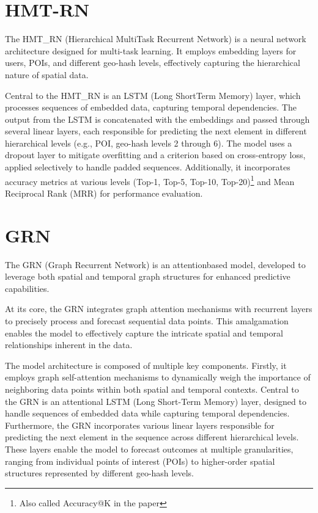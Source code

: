 \documentclass[twocolumn,twoside]{article}
\begin{document}
\section{HMT-RN}
The HMT\_RN (Hierarchical Multi\-Task Recurrent Network) is a
neural network architecture designed for multi-task learning. It employs
embedding layers for users, POIs, and different geo-hash levels,
effectively capturing the hierarchical nature of spatial data.

Central to the HMT\_RN is an LSTM (Long Short\-Term Memory) layer,
which processes sequences of embedded data, capturing temporal dependencies.
The output from the LSTM is concatenated with the embeddings
and passed through several linear layers, each responsible
for predicting the next element in different hierarchical
levels (e.g., POI, geo-hash levels 2 through 6). The model
uses a dropout layer to mitigate overfitting and a
criterion based on cross-entropy loss, applied selectively
to handle padded sequences. Additionally,
it incorporates accuracy metrics at various
levels (Top-1, Top-5, Top-10, Top-20)\footnote{Also called Accuracy@K in the paper\cite{main_paper}} and
Mean Reciprocal Rank (MRR) for performance
evaluation.
\section{GRN}
The GRN (Graph Recurrent Network) is an attention\-based model, developed to
leverage both spatial and temporal graph structures for enhanced predictive
capabilities.

At its core, the GRN integrates graph attention mechanisms
with recurrent layers to precisely process and forecast sequential data points.
This amalgamation enables the model to effectively capture the intricate
spatial and temporal relationships inherent in the data.

The model architecture is composed of multiple key components. Firstly, it employs
graph self-attention mechanisms to dynamically weigh the importance of
neighboring data points within both spatial and temporal contexts.
Central to the GRN is an attentional LSTM (Long Short-Term Memory) layer,
designed to handle sequences of embedded data while capturing temporal
dependencies. Furthermore, the GRN incorporates various linear layers
responsible for predicting the next element in the sequence across
different hierarchical levels. These layers enable the model to forecast
outcomes at multiple granularities, ranging from individual points of interest
(POIs) to higher-order spatial structures represented by different geo-hash levels.
\end{document}
